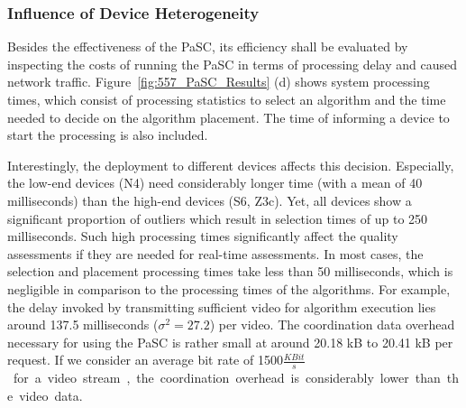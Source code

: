 \subsubsection{Influence of Device Heterogeneity}
Besides the effectiveness of the \ac{PaSC}, its efficiency shall be evaluated by inspecting the costs of running the \ac{PaSC} in terms of processing delay and caused network traffic.
Figure~\ref{fig:557_PaSC_Results} (d) shows system processing times, which consist of processing statistics to select an algorithm and the time needed to decide on the algorithm placement.
The time of informing a device to start the processing is also included.

Interestingly, the deployment to different devices affects this decision.
Especially, the low-end devices (N4) need considerably longer time (with a mean of 40 milliseconds) than the high-end devices (S6, Z3c).
Yet, all devices show a significant proportion of outliers which result in selection times of up to 250 milliseconds. 
Such high processing times significantly affect the quality assessments if they are needed for real-time assessments. 
In most cases, the selection and placement processing times take less than 50 milliseconds, which is negligible in comparison to the processing times of the algorithms.
For example, the delay invoked by transmitting sufficient video for algorithm execution lies around 137.5 milliseconds ($\sigma^2 =  27.2$) per video.
The coordination data overhead necessary for using the \ac{PaSC} is rather small at around 20.18 \unit{kB} to 20.41 \unit{kB} per request.
If we consider an average bit rate of 1500\unit{$\frac{KBit}{s}$} for a video stream, the coordination overhead is considerably lower than the video data. 